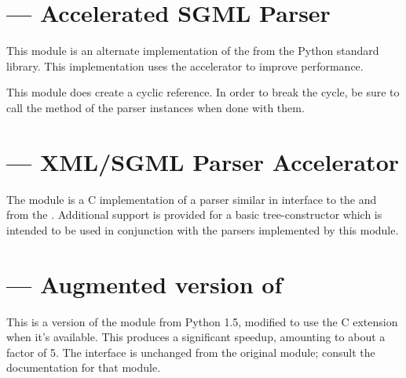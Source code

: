 \documentclass{howto}
\begin{document}
\begin{seealso}
\end{seealso}


\section{ ---
         Accelerated SGML Parser}


This module is an alternate implementation of the
from the Python standard library.  This implementation uses the
 accelerator to improve performance.

This module does create a cyclic reference.  In order to break the
cycle, be sure to call the  method of the parser
instances when done with them.


\section{ ---
         XML/SGML Parser Accelerator}


The  module is a C implementation of a
parser similar in interface to the  and
 from the .  Additional
support is provided for a basic tree-constructor which is intended to
be used in conjunction with the parsers implemented by this module.


\section{ ---
         Augmented version of }

This is a version of the  module from Python 1.5,
modified to use the  C extension when
it's available.  This produces a significant speedup, amounting to
about a factor of 5.  The interface is unchanged from the original
 module; consult the
 documentation for that module.
\end{document}
